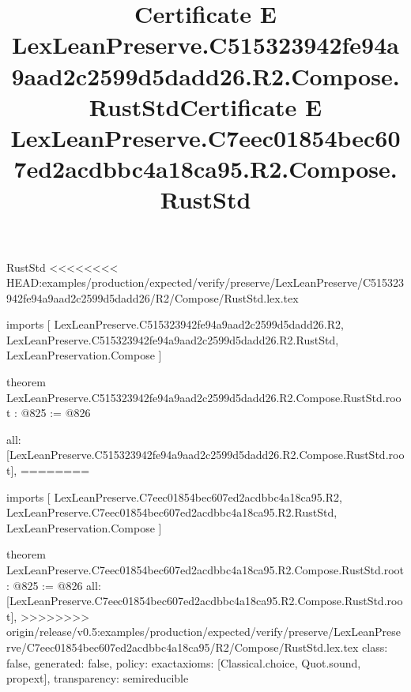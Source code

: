 \begin{lexlean}{RustStd}
<<<<<<<< HEAD:examples/production/expected/verify/preserve/LexLeanPreserve/C515323942fe94a9aad2c2599d5dadd26/R2/Compose/RustStd.lex.tex
\title{Certificate E LexLeanPreserve.C515323942fe94a9aad2c2599d5dadd26.R2.Compose.RustStd}
\begin{coremodule}
imports [
  LexLeanPreserve.C515323942fe94a9aad2c2599d5dadd26.R2,
  LexLeanPreserve.C515323942fe94a9aad2c2599d5dadd26.R2.RustStd,
  LexLeanPreservation.Compose
]

theorem LexLeanPreserve.C515323942fe94a9aad2c2599d5dadd26.R2.Compose.RustStd.root : @825 := @826 {
  all: [LexLeanPreserve.C515323942fe94a9aad2c2599d5dadd26.R2.Compose.RustStd.root],
========
\title{Certificate E LexLeanPreserve.C7eec01854bec607ed2acdbbc4a18ca95.R2.Compose.RustStd}
\begin{coremodule}
imports [
  LexLeanPreserve.C7eec01854bec607ed2acdbbc4a18ca95.R2,
  LexLeanPreserve.C7eec01854bec607ed2acdbbc4a18ca95.R2.RustStd,
  LexLeanPreservation.Compose
]

theorem LexLeanPreserve.C7eec01854bec607ed2acdbbc4a18ca95.R2.Compose.RustStd.root : @825 := @826 {
  all: [LexLeanPreserve.C7eec01854bec607ed2acdbbc4a18ca95.R2.Compose.RustStd.root],
>>>>>>>> origin/release/v0.5:examples/production/expected/verify/preserve/LexLeanPreserve/C7eec01854bec607ed2acdbbc4a18ca95/R2/Compose/RustStd.lex.tex
  class: false,
  generated: false,
  policy: exact{axioms: [Classical.choice, Quot.sound, propext]},
  transparency: semireducible
}


\end{coremodule}}
\end{coremodule}
\end{lexlean}
